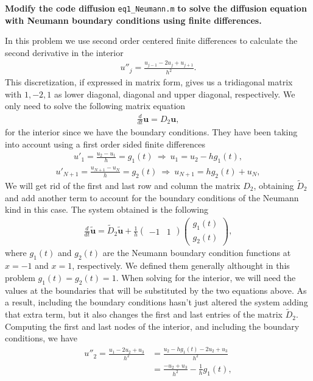\textbf{Modify the code diffusion} \verb+eq1_Neumann.m+ \textbf{to solve the diffusion equation with Neumann boundary conditions using finite differences.}

In this problem we use second order centered finite differences to calculate the second derivative in the interior
\begin{align*}
u''_j=\frac{u_{j-1}-2u_{j}+u_{j+1}}{h^2}.
\end{align*}
This discretization, if expressed in matrix form, gives us a tridiagonal matrix with $1,-2,1$ as lower diagonal, diagonal and upper diagonal, respectively. We only need to solve the following matrix equation
\begin{align*}
\frac{d}{dt}\textbf{u}=D_2\textbf{u},
\end{align*}
for the interior since we have the boundary conditions. They have been taking into account using a first order sided finite differences
\begin{align*}
u'_1=\frac{u_2-u_1}{h}=g_1(t)~\Rightarrow~u_1=u_2-hg_1(t),
\end{align*}
\begin{align*}
u'_{N+1}=\frac{u_{N+1}-u_N}{h}=g_2(t)~\Rightarrow~u_{N+1}=hg_2(t)+u_N,
\end{align*}
We will get rid of the first and last row and column the matrix $D_2$, obtaining $\tilde{D}_2$ and add another term to account for the boundary conditions of the Neumann kind in this case. The system obtained is the following
\begin{align*}
\frac{d}{dt}\tilde{\textbf{u}}=\tilde{D}_2\tilde{\textbf{u}}+\frac{1}{h}\begin{pmatrix} -1 & 1 \end{pmatrix}\begin{pmatrix} g_1(t) \\ g_2(t) \end{pmatrix},
\end{align*}
where $g_1(t)$ and $g_2(t)$ are the Neumann boundary condition functions at $x=-1$ and $x=1$, respectively. We defined them generally althought in this problem $g_1(t)=g_2(t)=1$. When solving for the interior, we will need the values at the boundaries that will be substituted by the two equations above. As a result, including the boundary conditions hasn't just altered the system adding that extra term, but it also changes the first and last entries of the matrix $\tilde{D}_2$. Computing the first and last nodes of the interior, and including the boundary conditions, we have
\begin{align*}
u''_2=\frac{u_1-2u_2+u_3}{h^2}&=\frac{u_2-hg_1(t)-2u_2+u_3}{h^2}\\
&=\frac{-u_2+u_3}{h^2}-\frac{1}{h} g_1(t),
\end{align*}
